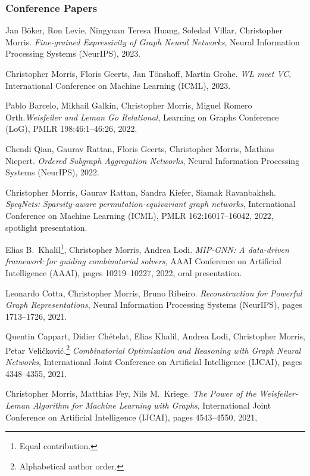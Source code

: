 \documentclass[11pt, a4paper, DIV=14, headings=small]{scrartcl}
\begin{document}
	\begin{thebibliography}{15}
		\subsubsection*{Conference Papers}
		Jan Böker, Ron Levie, Ningyuan Teresa Huang, Soledad Villar, Christopher Morris.
		\emph{Fine-grained Expressivity of Graph Neural Networks},  
		Neural Information Processing Systems (NeurIPS), 2023.		
		
		Christopher Morris, Floris Geerts, Jan Tönshoff, Martin Grohe.
		\emph{WL meet VC},
		International Conference on Machine Learning (ICML), 2023.
		
		Pablo Barcelo, Mikhail Galkin, Christopher Morris, Miguel Romero Orth.\footnotemark[2]
		\emph{Weisfeiler and Leman Go Relational},
		Learning on Graphs Conference (LoG), PMLR 198:46:1--46:26, 2022.
		
		Chendi Qian, Gaurav Rattan, Floris Geerts, Christopher Morris, Mathias Niepert.
		\emph{Ordered Subgraph Aggregation Networks},
		Neural Information Processing Systems (NeurIPS), 2022.
		
		Christopher Morris, Gaurav Rattan, Sandra Kiefer, Siamak Ravanbakhsh.
		\emph{SpeqNets: Sparsity-aware permutation-equivariant graph networks},
		International Conference on Machine Learning (ICML), PMLR 162:16017--16042, 2022, spotlight presentation.
		
		Elias B.\, Khalil\footnote{Equal contribution.}, Christopher Morris{\footnotemark[1]}, Andrea Lodi.
		\emph{MIP-GNN: A data-driven framework for guiding combinatorial solvers},
		AAAI Conference on Artificial Intelligence (AAAI), pages 10219--10227, 2022, oral presentation.
		
		Leonardo Cotta, Christopher Morris, Bruno Ribeiro.
		\emph{Reconstruction for Powerful Graph Representations},
		Neural Information Processing Systems (NeurIPS), pages 1713--1726, 2021.
		
		Quentin Cappart, Didier Chételat, Elias Khalil, Andrea Lodi, Christopher Morris, Petar Veli\v{c}kovi\'{c}.\footnote{Alphabetical author order.}
		\emph{Combinatorial Optimization and Reasoning with Graph Neural Networks},
		International Joint Conference on Artificial Intelligence (IJCAI), pages 4348--4355, 2021.
		
		Christopher Morris, Matthias Fey, Nils M.~Kriege.
		\emph{The Power of the Weisfeiler-Leman Algorithm for Machine Learning with Graphs},
		International Joint Conference on Artificial Intelligence (IJCAI), pages 4543--4550, 2021,
		

\end{thebibliography}
\end{document}
